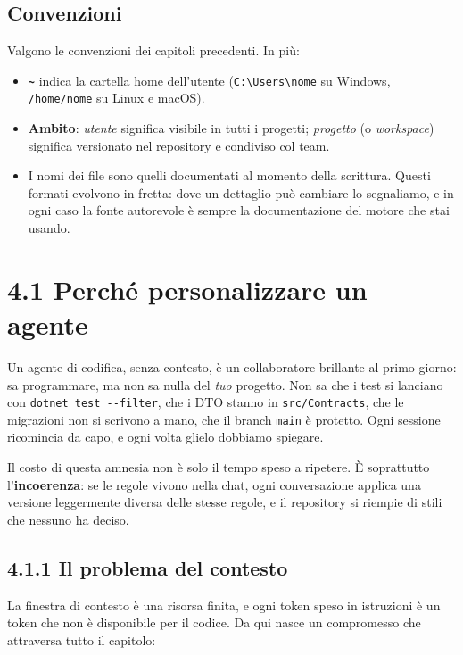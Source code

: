 \documentclass[
  italian,
  10pt,
]{book}
\providecommand{\tightlist}{%
  \setlength{\itemsep}{0pt}\setlength{\parskip}{0pt}}
\begin{document}
\subsection{Convenzioni}\label{convenzioni-1}

Valgono le convenzioni dei capitoli precedenti. In più:

\begin{itemize}
\tightlist
\item
  \textbf{\texttt{\textasciitilde{}}} indica la cartella home
  dell'utente (\texttt{C:\textbackslash{}Users\textbackslash{}nome} su
  Windows, \texttt{/home/nome} su Linux e macOS).
\item
  \textbf{Ambito}: \emph{utente} significa visibile in tutti i progetti;
  \emph{progetto} (o \emph{workspace}) significa versionato nel
  repository e condiviso col team.
\item
  I nomi dei file sono quelli documentati al momento della scrittura.
  Questi formati evolvono in fretta: dove un dettaglio può cambiare lo
  segnaliamo, e in ogni caso la fonte autorevole è sempre la
  documentazione del motore che stai usando.
\end{itemize}

\section{4.1 Perché personalizzare un
agente}\label{perchuxe9-personalizzare-un-agente}

Un agente di codifica, senza contesto, è un collaboratore brillante al
primo giorno: sa programmare, ma non sa nulla del \emph{tuo} progetto.
Non sa che i test si lanciano con \texttt{dotnet\ test\ -\/-filter}, che
i DTO stanno in \texttt{src/Contracts}, che le migrazioni non si
scrivono a mano, che il branch \texttt{main} è protetto. Ogni sessione
ricomincia da capo, e ogni volta glielo dobbiamo spiegare.

Il costo di questa amnesia non è solo il tempo speso a ripetere. È
soprattutto l'\textbf{incoerenza}: se le regole vivono nella chat, ogni
conversazione applica una versione leggermente diversa delle stesse
regole, e il repository si riempie di stili che nessuno ha deciso.

\subsection{4.1.1 Il problema del
contesto}\label{il-problema-del-contesto}

La finestra di contesto è una risorsa finita, e ogni token speso in
istruzioni è un token che non è disponibile per il codice. Da qui nasce
un compromesso che attraversa tutto il capitolo:
\end{document}
